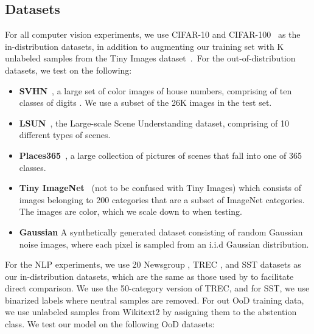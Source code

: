 \documentclass[accepted]{uai2021} \pdfoutput=1
\begin{document}
\subsection{Datasets}
For all computer vision experiments, we use CIFAR-10 and CIFAR-100~\cite{krizhevsky2009learning} as the in-distribution datasets, in addition to augmenting our training set with K unlabeled samples from the Tiny Images dataset~\cite{torralba200880}.~For the out-of-distribution datasets, we test on the following:
\begin{itemize}
	\item \textbf{SVHN}~\cite{netzer2011reading}, a large set of  color images of house numbers, comprising of ten classes of digits . We use a subset of the 26K images in the test set.
	
	\item \textbf{LSUN}~\cite{yu2015lsun}, the Large-scale Scene Understanding dataset, comprising of 10 different types of scenes.
	
	\item \textbf{Places365}~\cite{zhou2017places}, a large collection of pictures of scenes that fall into one of 365 classes. 
	
	\item\textbf{ Tiny ImageNet}~\cite{tiny_imagenet} (not to be confused with Tiny Images)  which consists of images belonging to 200 categories that are a subset of ImageNet categories. The images are  color, which we scale down to  when testing.
	
	\item \textbf{Gaussian} A synthetically generated dataset consisting of  random Gaussian noise images, where each pixel is sampled from an i.i.d Gaussian distribution.
\end{itemize}
For the NLP experiments, we use 20 Newsgroup \cite{20ng}, TREC \cite{trec}, and SST \cite{sst} datasets as our in-distribution datasets, which are the same as those used by \cite{hendrycks2018deep} to facilitate direct comparison. 
We use the 50-category version of TREC, and for SST, we use binarized labels where neutral samples are removed.
For out OoD training data, we use unlabeled samples from Wikitext2 by assigning them to the abstention class. We test our model on the following OoD datasets:
\end{document}
